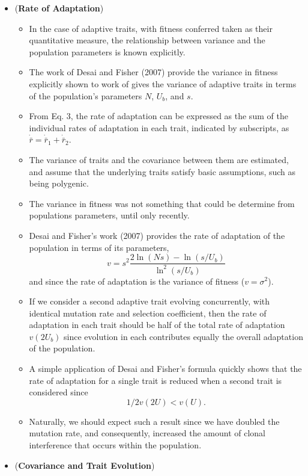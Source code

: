 \documentclass[11pt,one column]{article}
\begin{document}
\begin{itemize}
\item (\textbf{Rate of Adaptation})
\begin{itemize}
\item In the case of adaptive traits, with fitness conferred taken as their quantitative measure, the relationship between variance and the population parameters is known explicitly. 
\item The work of Desai and Fisher (2007) provide the variance in fitness explicitly shown to work of gives the variance of adaptive traits in terms of the population’s parameters $N$, $U_b$, and $s$. 
\item From Eq. 3, the rate of adaptation can be expressed as the sum of the individual rates of adaptation in each trait, indicated by subscripts, as $\dot{\bar{r}}=\dot{\bar{r}}_1 +\dot{\bar{r}}_2$.
\item The variance of traits and the covariance between them are estimated, and assume that the underlying traits satisfy basic assumptions, such as being polygenic. 
\item The variance in fitness was not something that could be determine from populations parameters, until only recently. 
\item Desai and Fisher’s work (2007) provides the rate of adaptation of the population in terms of its parameters, \[v =s^2  \frac{2 \ln(Ns)-\ln(s/U_b)}{\ln^2(s/U_b)}\] and since the rate of adaptation is the variance of fitness ($v=\sigma^2$).
\item If we consider a second adaptive trait evolving concurrently, with identical mutation rate and selection coefficient, then the rate of adaptation in each trait should be half of the total rate of adaptation $v(2U_b)$ since evolution in each contributes equally the overall adaptation of the population. 
\item A simple application of Desai and Fisher’s formula quickly shows that the rate of adaptation for a single trait is reduced when a second trait is considered since \[ 1/2  v(2U)<v(U). \]
\item Naturally, we should expect such a result since we have doubled the mutation rate, and consequently, increased the amount of clonal interference that occurs within the population. 
\end{itemize}

\item (\textbf{Covariance and Trait Evolution})
\begin{itemize}


\end{itemize}
\end{itemize}
\end{document}
